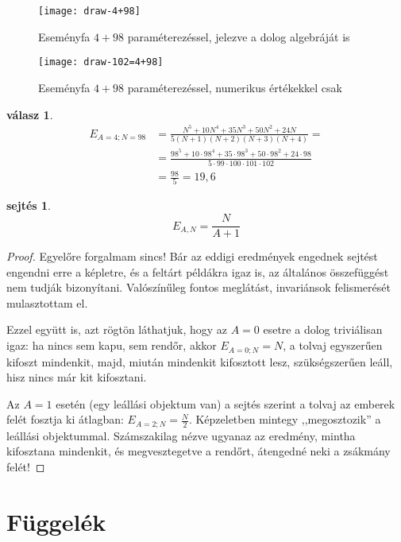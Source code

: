 \documentclass{article}
\newtheorem{answer}{válasz}
\newtheorem{conjecture}{sejtés}
\newcommand{\parenthesed}[1]{\left(#1\right)}
\begin{document}
	\begin{figure}[H]
		\caption*{Eseményfa $4+98$ paraméterezéssel, jelezve a dolog algebráját is}
		\centering
		\texttt{[image: draw-4+98]}
	\end{figure}

	\begin{figure}[H]
		\caption*{Eseményfa $4+98$ paraméterezéssel, numerikus értékekkel csak}
		\centering
		\texttt{[image: draw-102=4+98]}
	\end{figure}

	\begin{answer}
		\begin{align*}
			E_{A=4;N=98} &= \frac{N^5 + 10N^4 + 35N^3 +50N^2 + 24N}{5\parenthesed{N+1}\parenthesed{N+2}\parenthesed{N+3}\parenthesed{N+4}} =\\
			             &= \frac{98^5 + 10\cdot98^4 + 35\cdot98^3 +50\cdot98^2 + 24\cdot98}{5\cdot99\cdot100\cdot101\cdot102}\\
			             &= \frac{98}5 = 19,6
		\end{align*}
	\end{answer}

	\begin{conjecture}
		\[
			E_{A,N} = \frac N{A+1}
		\]
	\end{conjecture}
	\begin{proof}
		Egyelőre forgalmam sincs!
		Bár az eddigi eredmények engednek sejtést engendni erre a képletre, és a feltárt példákra igaz is, az általános összefüggést nem tudják bizonyítani.
		Valószínűleg fontos meglátást, invariánsok felismerését mulasztottam el.

		Ezzel együtt is, azt rögtön láthatjuk, hogy az $A=0$ esetre a dolog triviálisan igaz: ha nincs sem kapu, sem rendőr, akkor $E_{A=0;N} = N$, a tolvaj egyszerűen kifoszt mindenkit, majd, miután mindenkit kifosztott lesz, szükségszerűen leáll, hisz nincs már kit kifosztani.

		Az $A=1$ esetén (egy leállási objektum van) a sejtés szerint a tolvaj az emberek felét fosztja ki átlagban: $E_{A=2;N} = \frac N2$. Képzeletben mintegy ,,megosztozik'' a leállási objektummal. Számszakilag nézve ugyanaz az eredmény, mintha kifosztana mindenkit, és megvesztegetve a rendőrt, átengedné neki a zsákmány felét!
	\end{proof}

	\section{Függelék}
\end{document}
